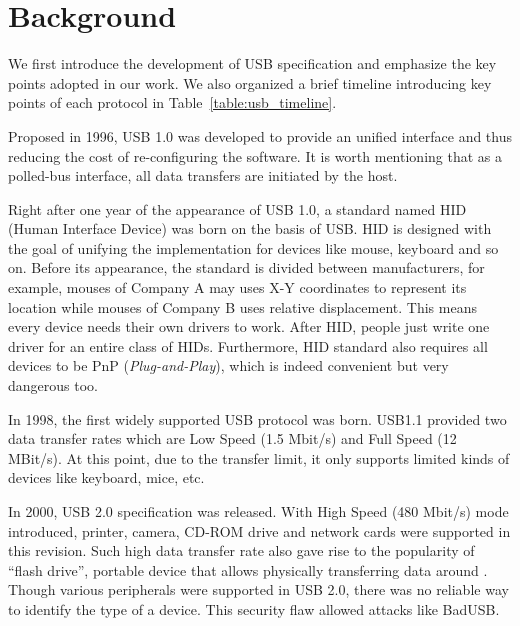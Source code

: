 \section{Background}
\label{sec:background}
We first introduce the development of USB specification and emphasize the key points adopted in our work. We also organized a brief timeline introducing key points of each protocol in Table~\ref{table:usb_timeline}.

Proposed in 1996, USB 1.0\cite{usb10} was developed to provide an unified interface and thus reducing the cost of re-configuring the software. It is worth mentioning that as a polled-bus interface, all data transfers are initiated by the host.

Right after one year of the appearance of USB 1.0, a standard named HID (Human Interface Device) was born on the basis of USB. HID is designed with the goal of unifying the implementation for devices like mouse, keyboard and so on. Before its appearance, the standard is divided between manufacturers, for example, mouses of Company A may uses X-Y coordinates to represent its location while mouses of Company B uses relative displacement. This means every device needs their own drivers to work. After HID, people just write one driver for an entire class of HIDs. Furthermore, HID standard also requires all devices to be PnP (\emph{Plug-and-Play}), which is indeed convenient but very dangerous too.

In 1998, the first widely supported USB protocol was born. USB1.1\cite{usb11} provided two data transfer rates which are Low Speed (1.5 Mbit/s) and Full Speed (12 MBit/s). At this point, due to the transfer limit, it only supports limited kinds of devices like keyboard, mice, etc.

In 2000, USB 2.0\cite{usb20} specification was released. With High Speed (480 Mbit/s) mode introduced, printer, camera, CD-ROM drive and network cards were supported in this revision. Such high data transfer rate also gave rise to the popularity of ``flash drive'', portable device that allows physically transferring data around \cite{sok}. Though various peripherals were supported in USB 2.0, there was no reliable way to identify the type of a device. This security flaw allowed attacks like BadUSB\cite{rubber}.

